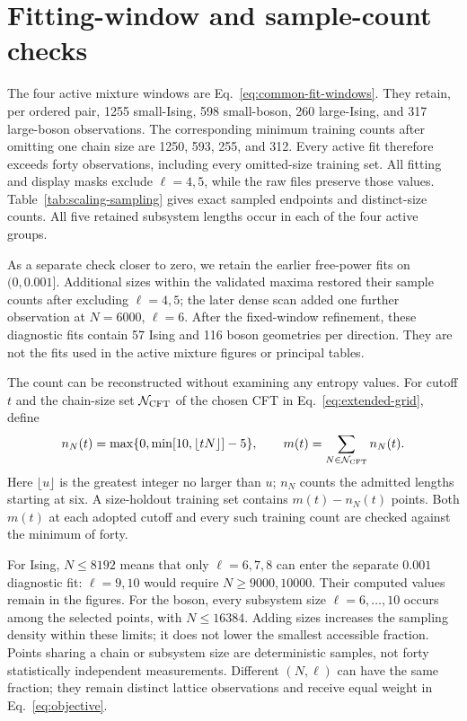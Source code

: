 \clearpage
\section{Fitting-window and sample-count checks}
\label{sec:window-comparison}
The four active mixture windows are Eq.~\eqref{eq:common-fit-windows}.
They retain, per ordered pair, 1255 small-Ising, 598 small-boson,
260 large-Ising, and 317 large-boson observations. The corresponding
minimum training counts after omitting one chain size are 1250, 593,
255, and 312. Every active fit therefore exceeds forty observations,
including every omitted-size training set. All fitting and display
masks exclude $\ell=4,5$, while the raw files preserve those values.
Table~\ref{tab:scaling-sampling} gives exact sampled endpoints and
distinct-size counts. All five retained subsystem lengths occur in
each of the four active groups.

As a separate check closer to zero, we retain the earlier free-power
fits on $(0,0.001]$. Additional sizes within the validated maxima
restored their sample counts after excluding $\ell=4,5$; the later
dense scan added one further observation at $N=6000$, $\ell=6$.
After the fixed-window refinement, these diagnostic fits contain
57 Ising and 116 boson geometries per direction. They are not
the fits used in the active mixture figures or principal tables.

The count can be reconstructed without examining any entropy values.
For cutoff $t$ and the chain-size set $\mathcal N_{\rm CFT}$ of the
chosen CFT in Eq.~\eqref{eq:extended-grid}, define
\begin{equation}
 n_N(t)=\max\{0,\min[10,\lfloor tN\rfloor]-5\},\qquad
 m(t)=\sum_{N\in\mathcal N_{\rm CFT}}n_N(t).
 \label{eq:fit-sample-count}
\end{equation}
Here $\lfloor u\rfloor$ is the greatest integer no larger than $u$;
$n_N$ counts the admitted lengths starting at six. A size-holdout
training set contains $m(t)-n_N(t)$ points. Both $m(t)$ at each adopted cutoff and every
such training count are checked against the minimum of forty.

For Ising, $N\leq8192$ means that only $\ell=6,7,8$ can enter
the separate $0.001$ diagnostic fit: $\ell=9,10$ would require $N\geq9000,10000$. Their computed
values remain in the figures. For the boson, every subsystem size
$\ell=6,\ldots,10$ occurs among the selected points, with
$N\leq16384$. Adding sizes increases the sampling density within
these limits; it does not lower the smallest accessible fraction.
Points sharing a chain or subsystem size are deterministic samples,
not forty statistically independent measurements.
Different $(N,\ell)$ can have the same fraction; they remain distinct
lattice observations and receive equal weight in Eq.~\eqref{eq:objective}.

